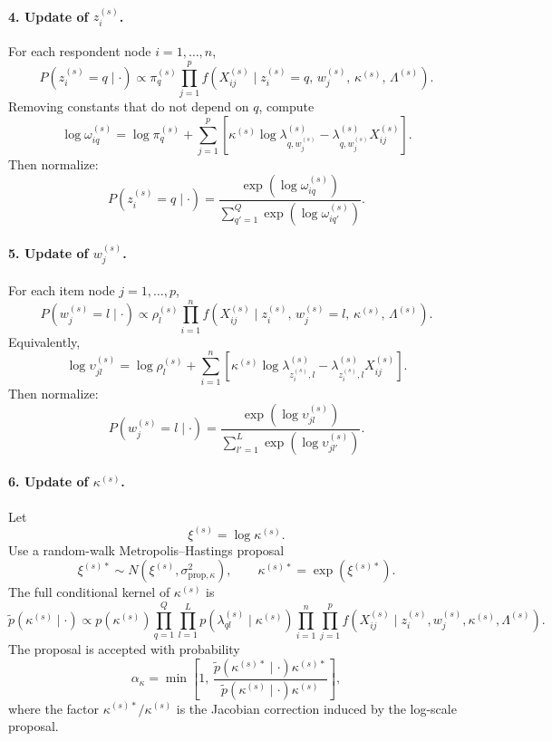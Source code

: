 \documentclass[A4paper,11pt]{article}
\begin{document}
\paragraph{4. Update of $z_i^{(s)}$.}
For each respondent node $i=1,\ldots,n$,
\[
P\left(z_i^{(s)}=q \mid \cdot \right)
\propto
\pi_q^{(s)}
\prod_{j=1}^p
f\left(
X^{(s)}_{ij}
\mid
z_i^{(s)}=q,\,
w_j^{(s)},\,
\kappa^{(s)},\,
\Lambda^{(s)}
\right).
\]
Removing constants that do not depend on $q$, compute
\[
\log \omega_{iq}^{(s)}
=
\log \pi_q^{(s)}
+
\sum_{j=1}^p
\left[
\kappa^{(s)}
\log \lambda_{q,w_j^{(s)}}^{(s)}
-
\lambda_{q,w_j^{(s)}}^{(s)}
X^{(s)}_{ij}
\right].
\]
Then normalize:
\[
P\left(z_i^{(s)}=q \mid \cdot \right)
=
\frac{\exp\left(\log \omega_{iq}^{(s)}\right)}
{\sum_{q'=1}^Q \exp\left(\log \omega_{iq'}^{(s)}\right)}.
\]

\paragraph{5. Update of $w_j^{(s)}$.}
For each item node $j=1,\ldots,p$,
\[
P\left(w_j^{(s)}=l \mid \cdot \right)
\propto
\rho_l^{(s)}
\prod_{i=1}^n
f\left(
X^{(s)}_{ij}
\mid
z_i^{(s)},\,
w_j^{(s)}=l,\,
\kappa^{(s)},\,
\Lambda^{(s)}
\right).
\]
Equivalently,
\[
\log \upsilon_{jl}^{(s)}
=
\log \rho_l^{(s)}
+
\sum_{i=1}^n
\left[
\kappa^{(s)}
\log \lambda_{z_i^{(s)},l}^{(s)}
-
\lambda_{z_i^{(s)},l}^{(s)}
X^{(s)}_{ij}
\right].
\]
Then normalize:
\[
P\left(w_j^{(s)}=l \mid \cdot \right)
=
\frac{\exp\left(\log \upsilon_{jl}^{(s)}\right)}
{\sum_{l'=1}^L \exp\left(\log \upsilon_{jl'}^{(s)}\right)}.
\]

\paragraph{6. Update of $\kappa^{(s)}$.}
Let
\[
\xi^{(s)}=\log \kappa^{(s)}.
\]
Use a random-walk Metropolis--Hastings proposal
\[
\xi^{(s)\ast}
\sim
N\left(\xi^{(s)},\sigma^2_{\mathrm{prop},\kappa}\right),
\qquad
\kappa^{(s)\ast}=\exp\left(\xi^{(s)\ast}\right).
\]
The full conditional kernel of $\kappa^{(s)}$ is
\[
\widetilde p\left(\kappa^{(s)} \mid \cdot \right)
\propto
p\left(\kappa^{(s)}\right)
\prod_{q=1}^Q
\prod_{l=1}^L
p\left(\lambda_{ql}^{(s)} \mid \kappa^{(s)}\right)
\prod_{i=1}^n
\prod_{j=1}^p
f\left(
X^{(s)}_{ij}
\mid
z_i^{(s)},w_j^{(s)},\kappa^{(s)},\Lambda^{(s)}
\right).
\]
The proposal is accepted with probability
\[
\alpha_\kappa
=
\min
\left[
1,\,
\frac{
\widetilde p\left(\kappa^{(s)\ast}\mid\cdot\right)\kappa^{(s)\ast}
}{
\widetilde p\left(\kappa^{(s)}\mid\cdot\right)\kappa^{(s)}
}
\right],
\]
where the factor $\kappa^{(s)\ast}/\kappa^{(s)}$ is the Jacobian correction induced by the log-scale proposal.
\end{document}
